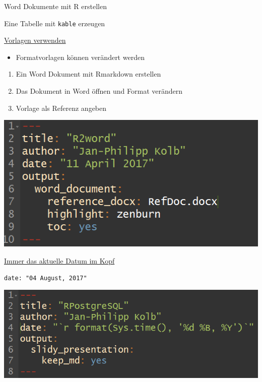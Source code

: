 \documentclass[ignorenonframetext,]{beamer}
\providecommand{\tightlist}{%
\setlength{\itemsep}{0pt}\setlength{\parskip}{0pt}}
\begin{document}
\begin{frame}[fragile]{Word Dokumente mit R erstellen}
\begin{block}{Eine Tabelle mit \texttt{kable} erzeugen}
\end{block}

\begin{block}{\href{http://rmarkdown.rstudio.com/articles_docx.html}{Vorlagen
verwenden}}

\begin{itemize}
\tightlist
\item
  Formatvorlagen können verändert werden
\end{itemize}

\begin{enumerate}
\def\labelenumi{\arabic{enumi}.}
\tightlist
\item
  Ein Word Dokument mit Rmarkdown erstellen
\item
  Das Dokument in Word öffnen und Format verändern
\item
  Vorlage als Referenz angeben
\end{enumerate}

\includegraphics{./tex2pdf.9796/11c0eff26eb75855b817e44357dbae92e1838d58.png}

\end{block}

\begin{block}{\href{http://stackoverflow.com/questions/23449319/yaml-current-date-in-rmarkdown}{Immer
das aktuelle Datum im Kopf}}

\begin{verbatim}
date: "04 August, 2017"
\end{verbatim}

\includegraphics{./tex2pdf.9796/ebadc2d71c01832b420043fed3246d42cb890263.png}


\end{block}
\end{frame}
\end{document}
